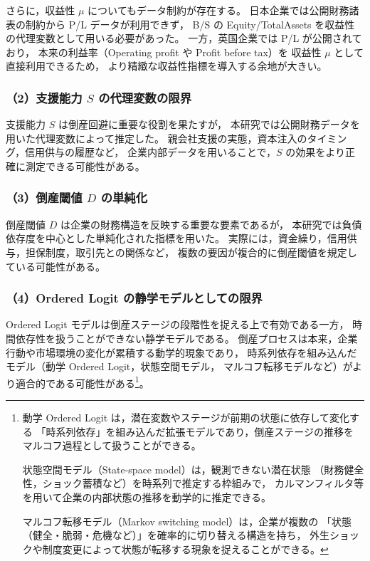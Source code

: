 さらに，収益性 $\mu$ についてもデータ制約が存在する。
日本企業では公開財務諸表の制約から P/L データが利用できず，
B/S の Equity/TotalAssets を収益性の代理変数として用いる必要があった。
一方，英国企業では P/L が公開されており，
本来の利益率（Operating profit や Profit before tax）を
収益性 $\mu$ として直接利用できるため，
より精緻な収益性指標を導入する余地が大きい。

\subsubsection*{（2）支援能力 $S$ の代理変数の限界}

支援能力 $S$ は倒産回避に重要な役割を果たすが，
本研究では公開財務データを用いた代理変数によって推定した。
親会社支援の実態，資本注入のタイミング，信用供与の履歴など，
企業内部データを用いることで，$S$ の効果をより正確に測定できる可能性がある。

\subsubsection*{（3）倒産閾値 $D$ の単純化}

倒産閾値 $D$ は企業の財務構造を反映する重要な要素であるが，
本研究では負債依存度を中心とした単純化された指標を用いた。
実際には，資金繰り，信用供与，担保制度，取引先との関係など，
複数の要因が複合的に倒産閾値を規定している可能性がある。

\subsubsection*{（4）Ordered Logit の静学モデルとしての限界}

Ordered Logit モデルは倒産ステージの段階性を捉える上で有効である一方，
時間依存性を扱うことができない静学モデルである。
倒産プロセスは本来，企業行動や市場環境の変化が累積する動学的現象であり，
時系列依存を組み込んだモデル（動学 Ordered Logit，状態空間モデル，
マルコフ転移モデルなど）がより適合的である可能性がある\footnote{
動学 Ordered Logit は，潜在変数やステージが前期の状態に依存して変化する
「時系列依存」を組み込んだ拡張モデルであり，倒産ステージの推移を
マルコフ過程として扱うことができる。

状態空間モデル（State-space model）は，観測できない潜在状態
（財務健全性，ショック蓄積など）を時系列で推定する枠組みで，
カルマンフィルタ等を用いて企業の内部状態の推移を動学的に推定できる。

マルコフ転移モデル（Markov switching model）は，企業が複数の
「状態（健全・脆弱・危機など）」を確率的に切り替える構造を持ち，
外生ショックや制度変更によって状態が転移する現象を捉えることができる。
}。

